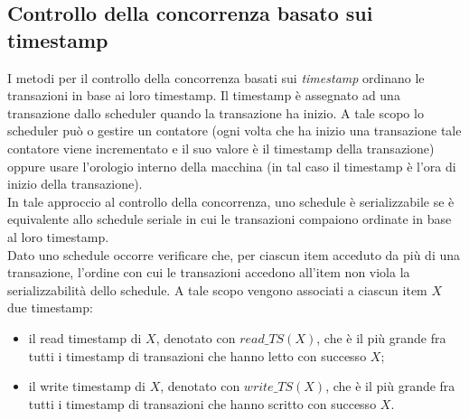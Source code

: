 \subsection{Controllo della concorrenza basato sui timestamp}
I metodi per il controllo della concorrenza basati sui \emph{timestamp} ordinano le transazioni in base ai
loro timestamp. Il timestamp è assegnato ad una transazione dallo scheduler quando la transazione
ha inizio. A tale scopo lo scheduler può o gestire un contatore (ogni volta che ha inizio una
transazione tale contatore viene incrementato e il suo valore è il timestamp della transazione)
oppure usare l'orologio interno della macchina (in tal caso il timestamp è l'ora di inizio della
transazione).\\
In tale approccio al controllo della concorrenza, uno schedule è serializzabile se è equivalente allo
schedule seriale in cui le transazioni compaiono ordinate in base al loro timestamp.\\
Dato uno schedule occorre verificare che, per ciascun item acceduto da più di una transazione,
l'ordine con cui le transazioni accedono all'item non viola la serializzabilità dello schedule. A tale
scopo vengono associati a ciascun item $X$ due timestamp:
\begin{itemize}
 \item il read timestamp di $X$, denotato con $read\_TS(X)$, che è il più grande fra tutti i timestamp di
transazioni che hanno letto con successo $X$;
 \item il write timestamp di $X$, denotato con $write\_TS(X)$, che è il più grande fra tutti i timestamp di
transazioni che hanno scritto con successo $X$.
\end{itemize}

